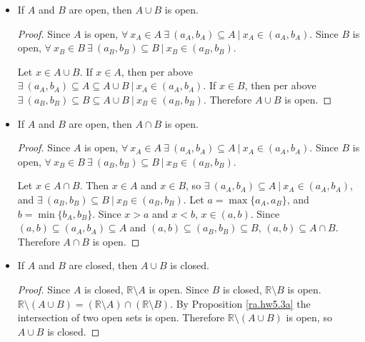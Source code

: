 \begin{itemize}
\item \begin{proposition}\label{ra.hw5.3b} If \(A\) and \(B\) are open, then \(A \cup B\) is open.  \end{proposition} 

\begin{proof} Since \(A\) is open, \(\forall \ x_A \in A \ \exists \ (a_A, b_A) \subseteq A \ | \ x_A \in (a_A, b_A)\). Since \(B\) is open, \(\forall \ x_B \in B \ \exists \ (a_B, b_B) \subseteq B \ | \ x_B \in (a_B, b_B)\). 

Let \(x \in A \cup B\). If \(x \in A\), then per above \( \exists \ (a_A, b_A) \subseteq A \subseteq A \cup B \ | \ x_A \in (a_A, b_A)\). If \(x \in B\), then per above \(\exists \ (a_B, b_B) \subseteq B \subseteq A \cup B \ | \ x_B \in (a_B, b_B)\). Therefore \(A \cup B\) is open.
\end{proof}

\item \begin{proposition}\label{ra.hw5.3a} If \(A\) and \(B\) are open, then \(A \cap B\) is open.  \end{proposition} 

\begin{proof} Since \(A\) is open, \(\forall \ x_A \in A \ \exists \ (a_A, b_A) \subseteq A \ | \ x_A \in (a_A, b_A)\). Since \(B\) is open, \(\forall \ x_B \in B \ \exists \ (a_B, b_B) \subseteq B \ | \ x_B \in (a_B, b_B)\).

Let \(x \in A \cap B\). Then \(x \in A\) and \(x \in B\), so \(\exists  \ (a_A, b_A) \subseteq A \ | \ x_A \in (a_A, b_A)\), and \(\exists \ (a_B, b_B) \subseteq B \ | \ x_B \in (a_B, b_B)\). Let \(a = \max \{a_A, a_B \}\), and \(b = \min \{b_A, b_B\} \). Since \(x > a\) and \(x < b\), \(x \in (a, b)\). Since \((a, b) \subseteq (a_A, b_A) \subseteq A\) and \((a, b) \subseteq (a_B, b_B) \subseteq B\), \((a, b) \subseteq A \cap B\). Therefore \(A \cap B\) is open. \end{proof}

\item \begin{proposition}\label{ra.hw5.4a} If \(A\) and \(B\) are closed, then \(A \cup B\) is closed. \end{proposition} 

\begin{proof} Since \(A\) is closed, \(\mathbb{R} \setminus A\) is open. Since \(B\) is closed, \(\mathbb{R} \setminus B\) is open. \(\mathbb{R} \setminus (A \cup B) = (\mathbb{R} \setminus A) \cap (\mathbb{R} \setminus B)\). By Proposition \ref{ra.hw5.3a} the intersection of two open sets is open. Therefore \(\mathbb{R} \setminus (A \cup B) \) is open, so \(A \cup B\) is closed.


\end{proof}
\end{itemize}
